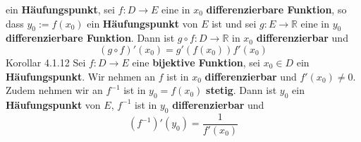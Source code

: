 \documentclass[landscape, 10pt]{article}
\newcommand{\R}{\mathbb{R}}
\begin{document}
\begin{multicols}{3}
                     ein \textbf{Häufungspunkt}, sei 
                     \textcolor{NavyBlue}{$f:D\longrightarrow E$}
                     eine in \textcolor{NavyBlue}{$x_0$}
                     \textbf{differenzierbare Funktion}, so dass 
                     \textcolor{NavyBlue}{$y_0:=f(x_0)$} ein 
                     \textbf{Häufungspunkt} von 
                     \textcolor{NavyBlue}{$E$} ist und 
                     sei \textcolor{NavyBlue}{
                     $g:E\longrightarrow\R$} eine in 
                     \textcolor{NavyBlue}{$y_0$} 
                     \textbf{differenzierbare Funktion}. 
                     Dann ist 
                     \textcolor{NavyBlue}{
                     $g\circ f:D\longrightarrow\R$} in 
                     \textcolor{NavyBlue}{$x_0$} 
                     \textbf{differenzierbar} und 
                     \begin{equation*}
                            (g\circ f)'(x_0)=g'(f(x_0))f'(x_0)
                     \end{equation*}
              \newpage
              \colorbox{BurntOrange}{Korollar 4.1.12}
                     Sei \textcolor{NavyBlue}{
                     $f:D\longrightarrow E$} eine 
                     \textbf{bijektive Funktion}, sei 
                     \textcolor{NavyBlue}{$x_0\in D$} 
                     ein \textbf{Häufungspunkt}. 
                     Wir nehmen an \textcolor{NavyBlue}{$f$} ist 
                     in \textcolor{NavyBlue}{$x_0$} 
                     \textbf{differenzierbar} und 
                     \textcolor{NavyBlue}{$f'(x_0)\neq0$}. 
                     Zudem nehmen 
                     wir an \textcolor{NavyBlue}{$f^{-1}$} 
                     ist in \textcolor{NavyBlue}{$y_0=f(x_0)$}
                     \textbf{stetig}. Dann ist 
                     \textcolor{NavyBlue}{$y_0$} ein 
                     \textbf{Häufungspunkt} von 
                     \textcolor{NavyBlue}{$E$}, 
                     \textcolor{NavyBlue}{$f^{-1}$} ist in 
                     \textcolor{NavyBlue}{$y_0$} 
                     \textbf{differenzierbar} und 
                     \begin{equation*}
                            (f^{-1})'(y_0)=\frac{1}{f'(x_0)}
                     \end{equation*}

\end{multicols}
\end{document}
